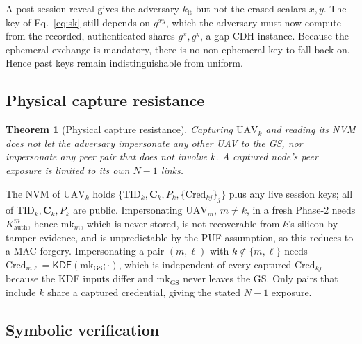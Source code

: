 \documentclass[journal]{IEEEtran}
\newtheorem{theorem}{Theorem}
\begin{document}
\begin{IEEEproof}
A post-session reveal gives the adversary $k_{\text{lt}}$ but not the erased
scalars $x, y$. The key of Eq.~\eqref{eq:sk} still depends on $g^{xy}$, which
the adversary must now compute from the recorded, authenticated shares
$g^{x}, g^{y}$, a gap-CDH instance. Because the ephemeral exchange is
mandatory, there is no non-ephemeral key to fall back on. Hence past keys remain
indistinguishable from uniform.
\end{IEEEproof}

\subsection{Physical capture resistance}

\begin{theorem}[Physical capture resistance]
\label{thm:capture}
Capturing $\text{UAV}_k$ and reading its NVM does not let the adversary
impersonate any other UAV to the GS, nor impersonate any peer pair that does not
involve $k$. A captured node's peer exposure is limited to its own $N-1$ links.
\end{theorem}

\begin{IEEEproof}
The NVM of $\text{UAV}_k$ holds $\{\text{TID}_k, \bm{C}_k, P_k, \{\text{Cred}_{kj}\}_j\}$
plus any live session keys; all of $\text{TID}_k, \bm{C}_k, P_k$ are public.
Impersonating $\text{UAV}_m$, $m \ne k$, in a fresh Phase-2 needs
$K^{m}_{\text{auth}}$, hence $\text{mk}_m$, which is never stored, is not
recoverable from $k$'s silicon by tamper evidence, and is unpredictable by the
PUF assumption, so this reduces to a MAC forgery. Impersonating a pair
$(m,\ell)$ with $k \notin \{m,\ell\}$ needs
$\text{Cred}_{m\ell} = \mathsf{KDF}(\text{mk}_{\text{GS}}; \cdot)$, which is
independent of every captured $\text{Cred}_{kj}$ because the KDF inputs differ
and $\text{mk}_{\text{GS}}$ never leaves the GS. Only pairs that include $k$
share a captured credential, giving the stated $N-1$ exposure.
\end{IEEEproof}

\subsection{Symbolic verification}
\end{document}
